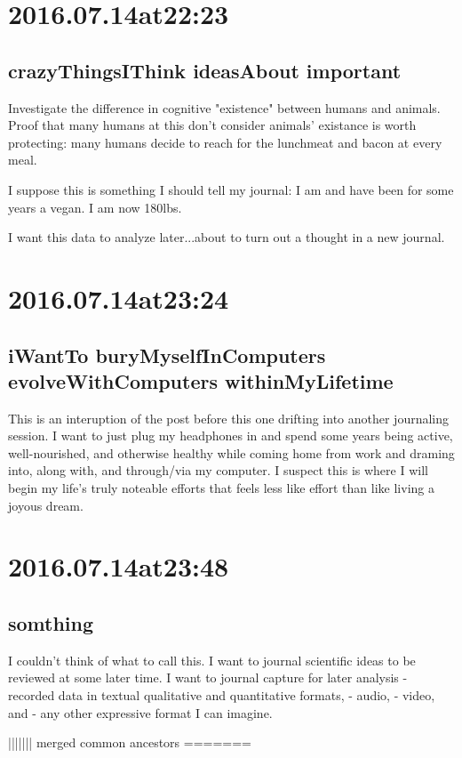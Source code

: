 \begin{enumerate}
\begin{enumerate}
\section*{ 2016.07.14at22:23 }
\subsection*{ crazyThingsIThink ideasAbout important }
Investigate the difference in cognitive "existence" between humans and animals. Proof that many humans at this don't consider animals' existance is worth protecting: many humans decide to reach for the lunchmeat and bacon at every meal.

I suppose this is something I should tell my journal: I am and have been for some years a vegan. I am now 180lbs.

I want this data to analyze later...about to turn out a thought in a new journal.

\section*{ 2016.07.14at23:24 }
\subsection*{ iWantTo buryMyselfInComputers evolveWithComputers withinMyLifetime }
This is an interuption of the post before this one drifting into another journaling session. I want to just plug my headphones in and spend some years being active, well-nourished, and otherwise healthy while coming home from work and draming into, along with, and through/via my computer. I suspect this is where I will begin my life's truly noteable efforts that feels less like effort than like living a joyous dream.

\section*{ 2016.07.14at23:48 }
\subsection*{ somthing }
I couldn't think of what to call this. I want to journal scientific ideas to be reviewed at some later time. I want to journal capture for later analysis
- recorded data in textual qualitative and quantitative formats,
- audio,
- video, and 
- any other expressive format I can imagine.

||||||| merged common ancestors
=======


\end{enumerate}
\end{enumerate}
